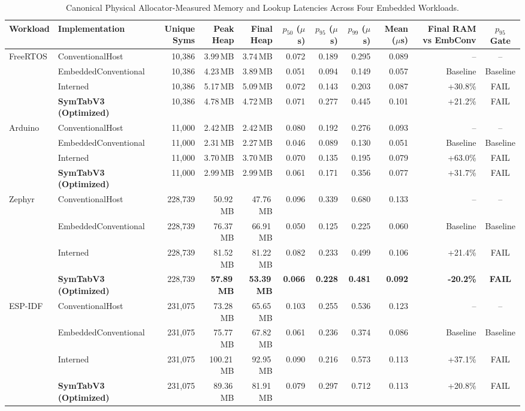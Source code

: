 \documentclass[conference]{IEEEtran}
\begin{document}
\begin{table}[t]
\centering
\caption{Canonical Physical Allocator-Measured Memory and Lookup Latencies Across Four Embedded Workloads.}
\label{tab:embedded_canonical}
\begin{tabular}{llrrrrrrrrc}
\toprule
Workload & Implementation & Unique Syms & Peak Heap & Final Heap & $p_{50}$ ($\mu$s) & $p_{95}$ ($\mu$s) & $p_{99}$ ($\mu$s) & Mean ($\mu$s) & Final RAM vs EmbConv & $p_{95}$ Gate \\
\midrule
FreeRTOS & ConventionalHost & 10,386 & 3.99\,MB & 3.74\,MB & 0.072 & 0.189 & 0.295 & 0.089 & -- & -- \\
 & EmbeddedConventional & 10,386 & 4.23\,MB & 3.89\,MB & 0.051 & 0.094 & 0.149 & 0.057 & Baseline & Baseline \\
 & Interned & 10,386 & 5.17\,MB & 5.09\,MB & 0.072 & 0.143 & 0.203 & 0.087 & +30.8\% & FAIL \\
 & \textbf{SymTabV3 (Optimized)} & 10,386 & 4.78\,MB & 4.72\,MB & 0.071 & 0.277 & 0.445 & 0.101 & +21.2\% & FAIL \\
\midrule
Arduino & ConventionalHost & 11,000 & 2.42\,MB & 2.42\,MB & 0.080 & 0.192 & 0.276 & 0.093 & -- & -- \\
 & EmbeddedConventional & 11,000 & 2.31\,MB & 2.27\,MB & 0.046 & 0.089 & 0.130 & 0.051 & Baseline & Baseline \\
 & Interned & 11,000 & 3.70\,MB & 3.70\,MB & 0.070 & 0.135 & 0.195 & 0.079 & +63.0\% & FAIL \\
 & \textbf{SymTabV3 (Optimized)} & 11,000 & 2.99\,MB & 2.99\,MB & 0.061 & 0.171 & 0.356 & 0.077 & +31.7\% & FAIL \\
\midrule
Zephyr & ConventionalHost & 228,739 & 50.92\,MB & 47.76\,MB & 0.096 & 0.339 & 0.680 & 0.133 & -- & -- \\
 & EmbeddedConventional & 228,739 & 76.37\,MB & 66.91\,MB & 0.050 & 0.125 & 0.225 & 0.060 & Baseline & Baseline \\
 & Interned & 228,739 & 81.52\,MB & 81.22\,MB & 0.082 & 0.233 & 0.499 & 0.106 & +21.4\% & FAIL \\
 & \textbf{SymTabV3 (Optimized)} & 228,739 & \textbf{57.89\,MB} & \textbf{53.39\,MB} & \textbf{0.066} & \textbf{0.228} & \textbf{0.481} & \textbf{0.092} & \textbf{-20.2\%} & \textbf{FAIL} \\
\midrule
ESP-IDF & ConventionalHost & 231,075 & 73.28\,MB & 65.65\,MB & 0.103 & 0.255 & 0.536 & 0.123 & -- & -- \\
 & EmbeddedConventional & 231,075 & 75.77\,MB & 67.82\,MB & 0.061 & 0.236 & 0.374 & 0.086 & Baseline & Baseline \\
 & Interned & 231,075 & 100.21\,MB & 92.95\,MB & 0.090 & 0.216 & 0.573 & 0.113 & +37.1\% & FAIL \\
 & \textbf{SymTabV3 (Optimized)} & 231,075 & 89.36\,MB & 81.91\,MB & 0.079 & 0.297 & 0.712 & 0.113 & +20.8\% & FAIL \\
\bottomrule
\end{tabular}
\end{table}
\end{document}
